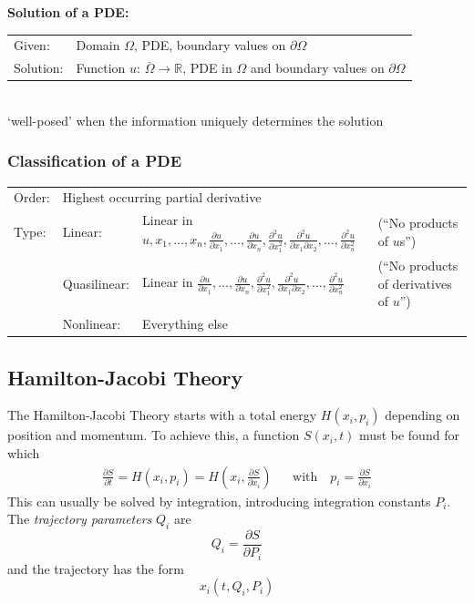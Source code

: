 \textbf{Solution of a PDE:}\\
\begin{tabular}{ll}
Given:& Domain $\Omega$, PDE, boundary values on $\partial\Omega$\\
Solution:& Function $u$: $\overset{\_}{\Omega}\rightarrow \mathbb{R}$, PDE in $\Omega$ and boundary values on $\partial\Omega$\\
\end{tabular}\\
`well-posed' when the information uniquely determines the solution

\subsubsection{Classification of a PDE}
\begin{tabular}{llll}
Order:& \multicolumn{3}{l}{Highest occurring partial derivative}\\
Type:& Linear: & Linear in $u, x_1,\ldots,x_n, \frac{\partial u}{\partial x_1},\ldots,\frac{\partial u}{\partial x_n},
\frac{\partial^2 u}{\partial x_1^2},\frac{\partial^2 u}{\partial x_1 \partial x_2},\ldots,\frac{\partial^2 u}{\partial x_n^2}$
& (``No products of $u$s'')\\
& Quasilinear: & Linear in $\frac{\partial u}{\partial x_1},\ldots,\frac{\partial u}{\partial x_n},
\frac{\partial^2 u}{\partial x_1^2},\frac{\partial^2 u}{\partial x_1 \partial x_2},\ldots,\frac{\partial^2 u}{\partial x_n^2}$
& (``No products of derivatives of $u$'')\\
& Nonlinear: & Everything else
\end{tabular}




\subsection{Hamilton-Jacobi Theory}
The Hamilton-Jacobi Theory starts with a total energy $H(x_i,p_i)$ depending on position and momentum. To achieve this, a function $S(x_i,t)$ must be found for which
\begin{align*}
\frac{\partial S}{\partial t} = H\left(x_i,p_i\right) = H\left(x_i,\frac{\partial S}{\partial x_i}\right)
&& \text{with} \quad
p_i = \frac{\partial S}{\partial x_i}
\end{align*}
This can usually be solved by integration, introducing integration constants $P_i$.
The \emph{trajectory parameters} $Q_i$ are
\[
    Q_i = \frac{\partial S}{\partial P_i}
\]
and the trajectory has the form
\[
    x_i(t,Q_i,P_i)
\]





%


